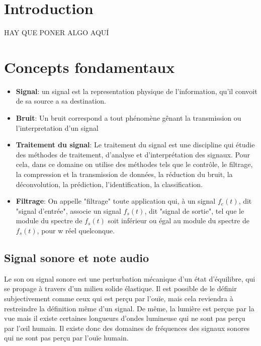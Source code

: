\documentclass[conference,onecolumn]{IEEEtran}
\begin{document}
\section{Introduction}
HAY QUE PONER ALGO AQUÍ

\section{Concepts fondamentaux}

\begin{itemize} %
    \item[] \textbf{Signal}: un signal est la representation physique de l'information, qu'il convoit de sa source a sa destination.

    \item[] \textbf{Bruit}: Un bruit correspond a tout phénomène gênant la transmission ou l'interpretation d'un signal

    \item[] \textbf{Traitement du signal}: Le traitement du signal est une discipline qui étudie des méthodes de traitement, d’analyse et d’interprétation des signaux. Pour cela, dans ce domaine on utilise des méthodes tels que le contrôle, le filtrage, la compression et la transmission de données, la réduction du bruit, la déconvolution, la prédiction, l'identification, la classification.  

    \item[] \textbf{Filtrage}: On appelle "filtrage" toute application qui, à un signal $f_e(t)$, dit "signal d'entrée", associe un signal $f_s(t)$, dit "signal de sortie", tel que le module du spectre de $f_s(t)$ soit inférieur ou égal au module du spectre de $f_s(t)$, pour w réel quelconque. 
\end{itemize}

\subsection{Signal sonore et note audio}
Le son ou signal sonore est une perturbation mécanique d’un état d’équilibre, qui se propage à travers d’un milieu solide élastique. Il est possible de le définir subjectivement comme ceux qui est perçu par l’ouïe, mais cela reviendra à restreindre la définition même d’un signal. De même, la lumière est perçue par la vue mais il existe certaines longueurs d’ondes lumineuse qui ne sont pas perçu par l’œil humain. Il existe donc des domaines de fréquences des signaux sonores qui ne sont pas perçu par l’ouïe humain. 
\end{document}
